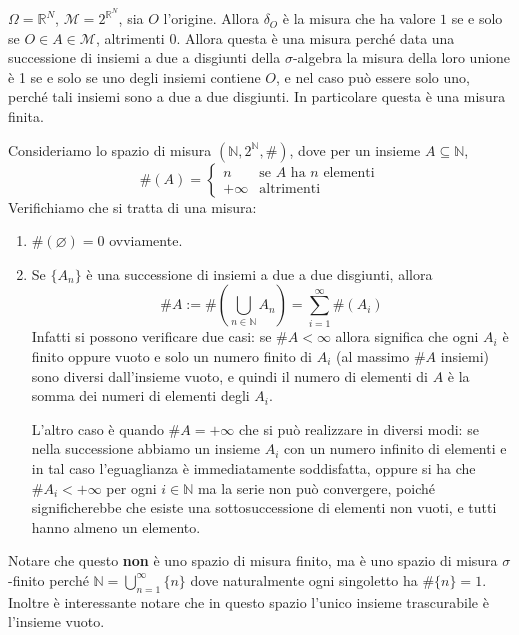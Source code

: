 \begin{example}
    \(\Omega = \mathbb{R}^{N}\), \(\mathcal{M} = 2^{\mathbb{R}^{N}}\), sia
        \(O\) l'origine. Allora \(\delta_O\) è la misura che ha valore \(1\) se
        e solo se \(O \in A \in \mathcal{M}\), altrimenti 0. Allora questa è una
        misura perché data una successione di insiemi a due a disgiunti della
        \(\sigma\)-algebra la misura della loro unione è 1 se e solo se uno
        degli insiemi contiene \(O\), e nel caso può essere solo uno, perché
        tali insiemi sono a due a due disgiunti. In particolare questa è una
        misura finita.
\end{example}

\begin{example}
    Consideriamo lo spazio di misura \((\mathbb{N}, 2^{\mathbb{N}}, \#)\), dove
    per un insieme \(A \subseteq \mathbb{N}\), 
    \[
        \#(A) = \begin{cases}
            n & \text{se } A \text{ ha } n \text{ elementi}\\
            +\infty & \text{altrimenti}
        \end{cases}
    \]
    Verifichiamo che si tratta di una misura:
    \begin{enumerate}[label = \arabic*.]
        \item \(\#(\varnothing) = 0\) ovviamente.
        \item Se \(\{A_{n}\} \) è una successione di insiemi a due a due
            disgiunti, allora \[\#A := \#\left(\bigcup_{n \in \mathbb{N}}
                A_{n}\right) = \sum_{i=1}^{\infty}
            \#(A_{i}) \]
            Infatti si possono verificare due casi: se \(\#A < \infty\) allora
            significa che ogni \(A_{i}\) è finito oppure vuoto e solo un numero
            finito di \(A_{i}\) (al massimo \(\#A\) insiemi) sono diversi
            dall'insieme vuoto, e quindi il numero di elementi di \(A\) è la
            somma dei numeri di elementi degli \(A_{i}\).

            L'altro caso è quando \(\#A = +\infty\) che si può realizzare in
            diversi modi: se nella successione abbiamo un insieme \(A_{i}\) con
            un numero infinito di elementi e in tal caso l'eguaglianza è
            immediatamente soddisfatta, oppure si ha che \(\#A_{i} < +\infty\)
            per ogni \(i \in \mathbb{N}\) ma la serie non può convergere, poiché
            significherebbe che esiste una sottosuccessione di elementi non
            vuoti, e tutti hanno almeno un elemento.
    \end{enumerate}

    Notare che questo \textbf{non} è uno spazio di misura finito, ma è uno
    spazio di misura \(\sigma\)-finito perché \(\mathbb{N} =
    \bigcup_{n=1}^\infty \{n\}\) dove naturalmente ogni singoletto ha \(\#\{n\}
    = 1\). Inoltre è interessante notare che in questo spazio l'unico insieme
    trascurabile è l'insieme vuoto.
\end{example}

